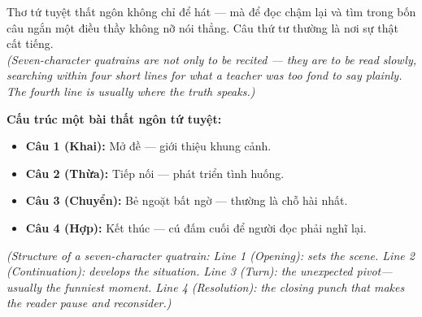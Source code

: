 
\begin{baihoc}
Thơ tứ tuyệt thất ngôn không chỉ để hát --- mà để đọc chậm lại và tìm trong bốn câu ngắn một điều thầy không nỡ nói thẳng. Câu thứ tư thường là nơi sự thật cất tiếng.\\
\textit{(Seven-character quatrains are not only to be recited --- they are to be read slowly, searching within four short lines for what a teacher was too fond to say plainly. The fourth line is usually where the truth speaks.)}
\end{baihoc}

\begin{ghinhoanh}
\textbf{Cấu trúc một bài thất ngôn tứ tuyệt:}\\[4pt]
\begin{itemize}[leftmargin=*]
  \item \textbf{Câu 1 (Khai):} Mở đề --- giới thiệu khung cảnh.
  \item \textbf{Câu 2 (Thừa):} Tiếp nối --- phát triển tình huống.
  \item \textbf{Câu 3 (Chuyển):} Bẻ ngoặt bất ngờ --- thường là chỗ hài nhất.
  \item \textbf{Câu 4 (Hợp):} Kết thúc --- cú đấm cuối để người đọc phải nghĩ lại.
\end{itemize}
\textit{(Structure of a seven-character quatrain: Line 1 (Opening): sets the scene. Line 2 (Continuation): develops the situation. Line 3 (Turn): the unexpected pivot---usually the funniest moment. Line 4 (Resolution): the closing punch that makes the reader pause and reconsider.)}
\end{ghinhoanh}
